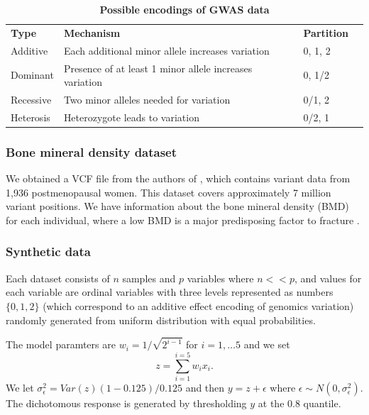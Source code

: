 \documentclass[10pt,letterpaper]{article}
\newlength\savedwidth
\newcommand\thickhline{\noalign{\global\savedwidth\arrayrulewidth\global\arrayrulewidth 2pt}%
\hline
\noalign{\global\arrayrulewidth\savedwidth}}
\begin{document}
\begin{table}[!ht]
\begin{flushleft} 
\centering
\caption{\bf Possible encodings of GWAS data \cite[]{Goldstein.et.al.2011}}
\begin{tabular}{|l|l|l|l||}
\hline
{\bf Type} & {\bf Mechanism}                                         & {\bf Partition} \\ 
\thickhline
Additive   & Each additional minor allele increases variation        & 0, 1, 2         \\
Dominant   & Presence of at least 1 minor allele increases variation & 0, 1/2          \\
Recessive  & Two minor alleles needed for variation                  & 0/1, 2          \\
Heterosis  & Heterozygote leads to variation                         & 0/2, 1          \\ \hline
\end{tabular}
\label{table:encodings}
\end{flushleft}
\end{table}


\subsubsection{Bone mineral density dataset}
We obtained a VCF file from the authors of \cite{Duncan2011}, which contains variant data from 1,936 postmenopausal women.
This dataset covers approximately 7 million variant positions. We have information about the bone mineral density (BMD)
for each individual, where a low BMD is a major predisposing factor to fracture \cite{Duncan2011}. 

\subsubsection{Synthetic data} 
\label{section:synthetic_data}
 Each dataset consists of $n$ samples and $p$ variables where $n << p$,
and values for each variable are ordinal variables with three levels represented as numbers $\{0, 1, 2\}$ (which
correspond to an additive effect encoding of genomics variation) randomly generated from uniform distribution with equal
probabilities.  

The model paramters are $w_i = 1/\sqrt{2^{i-1}}$ for $i =1,\ldots 5$ and we set 
$$
z =  \sum_{i=1}^{i=5} {w_i x_i}.
$$
We let $\sigma_\epsilon^2 = Var(z)(1- 0.125)/0.125 $ and then 
$y =   z + \epsilon$ where $\epsilon \sim  N(0, \sigma_\epsilon^2).$
The dichotomous response is generated by thresholding $y$ at the $0.8$ quantile.
\end{document}
